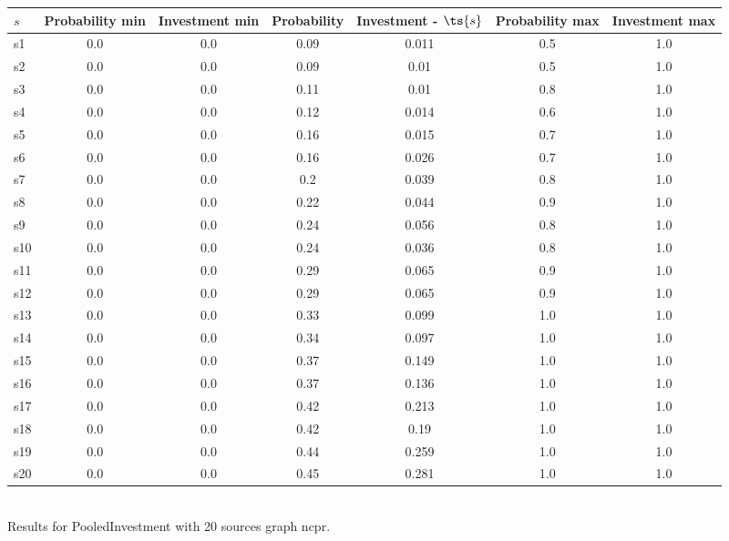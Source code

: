 \documentclass{article}
\begin{document}
\noindent\begin{tabular}{|l|c|c|c|c|c|c|}
\hline
$s$& Probability min & Investment min & Probability & Investment - $\ts{s}$ & Probability max & Investment max\\
\hline
s1 &0.0 & 0.0 & 0.09 & 0.011 & 0.5 & 1.0\\
\hline
s2 &0.0 & 0.0 & 0.09 & 0.01 & 0.5 & 1.0\\
\hline
s3 &0.0 & 0.0 & 0.11 & 0.01 & 0.8 & 1.0\\
\hline
s4 &0.0 & 0.0 & 0.12 & 0.014 & 0.6 & 1.0\\
\hline
s5 &0.0 & 0.0 & 0.16 & 0.015 & 0.7 & 1.0\\
\hline
s6 &0.0 & 0.0 & 0.16 & 0.026 & 0.7 & 1.0\\
\hline
s7 &0.0 & 0.0 & 0.2 & 0.039 & 0.8 & 1.0\\
\hline
s8 &0.0 & 0.0 & 0.22 & 0.044 & 0.9 & 1.0\\
\hline
s9 &0.0 & 0.0 & 0.24 & 0.056 & 0.8 & 1.0\\
\hline
s10 &0.0 & 0.0 & 0.24 & 0.036 & 0.8 & 1.0\\
\hline
s11 &0.0 & 0.0 & 0.29 & 0.065 & 0.9 & 1.0\\
\hline
s12 &0.0 & 0.0 & 0.29 & 0.065 & 0.9 & 1.0\\
\hline
s13 &0.0 & 0.0 & 0.33 & 0.099 & 1.0 & 1.0\\
\hline
s14 &0.0 & 0.0 & 0.34 & 0.097 & 1.0 & 1.0\\
\hline
s15 &0.0 & 0.0 & 0.37 & 0.149 & 1.0 & 1.0\\
\hline
s16 &0.0 & 0.0 & 0.37 & 0.136 & 1.0 & 1.0\\
\hline
s17 &0.0 & 0.0 & 0.42 & 0.213 & 1.0 & 1.0\\
\hline
s18 &0.0 & 0.0 & 0.42 & 0.19 & 1.0 & 1.0\\
\hline
s19 &0.0 & 0.0 & 0.44 & 0.259 & 1.0 & 1.0\\
\hline
s20 &0.0 & 0.0 & 0.45 & 0.281 & 1.0 & 1.0\\
\hline
\end{tabular}\\

\noindent Results for PooledInvestment with 20 sources graph ncpr.
\end{document}
